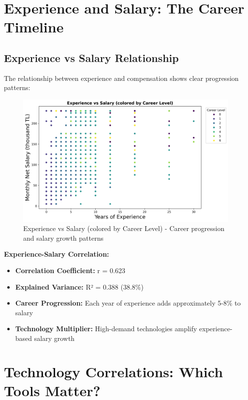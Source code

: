 \documentclass[12pt,a4paper]{article}
\begin{document}
\section{Experience and Salary: The Career Timeline}

\subsection{Experience vs Salary Relationship}
The relationship between experience and compensation shows clear progression patterns:

\begin{figure}[H]
    \centering
    \includegraphics[width=\textwidth]{figures/scatter_experience_salary.png}
    \caption{Experience vs Salary (colored by Career Level) - Career progression and salary growth patterns}
\end{figure}

\textbf{Experience-Salary Correlation:}
\begin{itemize}
    \item \textbf{Correlation Coefficient:} r = 0.623
    \item \textbf{Explained Variance:} R² = 0.388 (38.8\%)
    \item \textbf{Career Progression:} Each year of experience adds approximately 5-8\% to salary
    \item \textbf{Technology Multiplier:} High-demand technologies amplify experience-based salary growth
\end{itemize}

\section{Technology Correlations: Which Tools Matter?}
\end{document}
